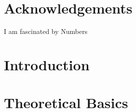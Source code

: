 \documentclass{scrbook}
\begin{document}
  
\maketitle

\frontmatter

\chapter{Acknowledgements}
\epigraph{I am fascinated by Numbers}{\citeauthor{baron-cohen-aq} \cite{baron-cohen-aq}}


\tableofcontents

\mainmatter

\chapter{Introduction}


\chapter{Theoretical Basics}


\backmatter

\printbibliography
{}
\end{document}
